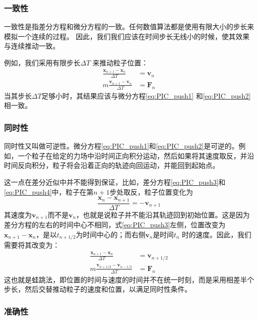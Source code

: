 {\subsubsection{一致性}
      一致性是指差分方程和微分方程的一致。任何数值算法都是使用有限大小的步长来模拟一个连续的过程。
      因此，我们我们应该在时间步长无线小的时候，使其效果与连续推动一致。

      例如，我们采用有限步长$\Delta T$ 来推动粒子位置：
      \begin{align}
         \label{eq:PIC_push3}
         \frac{\mathbf{x}_{n+1}-\mathbf{x}_n}{\Delta T} &= \mathbf{v}_n  \\
         \label{eq:PIC_push4}
          m\frac{\mathbf{v}_{n+1}-\mathbf{v}_n}{\Delta T} &= \mathbf{F}_n
      \end{align}
                当其步长$\Delta T$足够小时，其结果应该与微分方程\ref{eq:PIC_push1} 和\ref{eq:PIC_push2}相一致。
\subsubsection{同时性}
      同时性又叫做可逆性。微分方程\ref{eq:PIC_push1}和\ref{eq:PIC_push2}是可逆的。例如，一个粒子在给定的力场中沿时间正向积分运动，然后如果将其速度取反，并沿时间反向积分，粒子将会沿着正向的轨迹向回运动，并能回到起始点。

      这一点在差分近似中并不能得到保证，比如，差分方程\ref{eq:PIC_push3}和\ref{eq:PIC_push4}中，粒子在第$n+1$步处取反，粒子位置变化为
      \begin{equation}
         \label{eq:PIC_push5}
         \frac{\mathbf{x}_{n}-\mathbf{x}_{n+1}}{\Delta T} = -\mathbf{v}_{n+1}
      \end{equation}
      其速度为$\mathbf{v}_{n+1}$而不是$\mathbf{v}_{n}$，也就是说粒子并不能沿其轨迹回到初始位置。这是因为差分方程的左右的时间中心不相同，式\ref{eq:PIC_push3}左侧，位置改变为$\mathbf{x}_{n+1}-\mathbf{x}_n$，是以$t_{n+1/2}$为时间中心的；而右侧$\mathbf{v}_n$是时间$t_{n}$ 时的速度。因此，我们需要将其改变为：
      \begin{align}
         \label{eq:PIC_push6}
         \frac{\mathbf{x}_{n+1}-\mathbf{x}_n}{\Delta T} &= \mathbf{v}_{n+1/2}  \\
         \label{eq:PIC_push7}
          m\frac{\mathbf{v}_{n+1/2}-\mathbf{v}_{n-1/2}}{\Delta T} &= \mathbf{F}_n
      \end{align}
      这也就是蛙跳法，即位置的时间与速度的时间并不在统一时刻，而是采用相差半个步长，然后交替推动粒子的速度和位置，以满足同时性条件。
\subsubsection{准确性}

}
